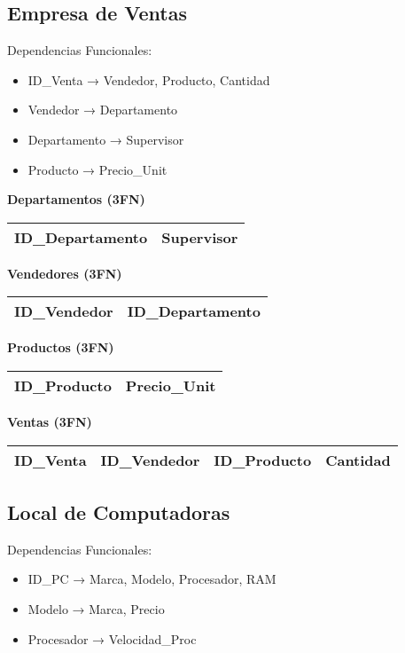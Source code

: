 \documentclass[12pt]{article}
\begin{document}
\subsection{Empresa de Ventas}

Dependencias Funcionales:
\begin{itemize}
    \item ID\_Venta → Vendedor, Producto, Cantidad
    \item Vendedor → Departamento
    \item Departamento → Supervisor
    \item Producto → Precio\_Unit
\end{itemize}

\textbf{Departamentos (3FN)}
\begin{center}
\begin{tabular}{|l|l|}
\hline
ID\_Departamento & Supervisor \\
\hline
\end{tabular}
\end{center}

\textbf{Vendedores (3FN)}
\begin{center}
\begin{tabular}{|l|l|}
\hline
ID\_Vendedor & ID\_Departamento \\
\hline
\end{tabular}
\end{center}

\textbf{Productos (3FN)}
\begin{center}
\begin{tabular}{|l|l|}
\hline
ID\_Producto & Precio\_Unit \\
\hline
\end{tabular}
\end{center}

\textbf{Ventas (3FN)}
\begin{center}
\begin{tabular}{|l|l|l|l|}
\hline
ID\_Venta & ID\_Vendedor & ID\_Producto & Cantidad \\
\hline
\end{tabular}
\end{center}

\subsection{Local de Computadoras}

Dependencias Funcionales:
\begin{itemize}
    \item ID\_PC → Marca, Modelo, Procesador, RAM
    \item Modelo → Marca, Precio
    \item Procesador → Velocidad\_Proc
\end{itemize}
\end{document}
